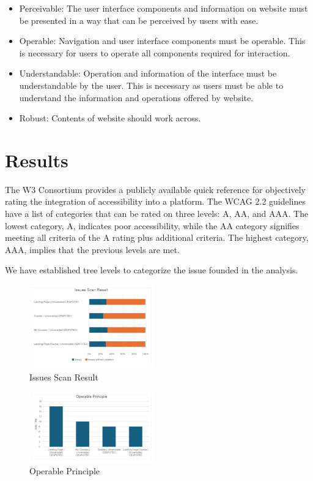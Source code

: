 \documentclass{IEEEtran}
\begin{document}
\begin{itemize}
    \item Perceivable: The user interface components and information on website must be presented in a way that can be perceived by users with ease.
    \item Operable: Navigation and user interface components must be operable. This is necessary for users to operate all components required for interaction.
    \item Understandable: Operation and information of the interface must be understandable by the user. This is necessary as users must be able to understand the information and operations offered by website.
    \item Robust: Contents of website should work across.
\end{itemize}



\section{Results}
The W3 Consortium provides a publicly available quick reference for objectively rating the integration of accessibility into a platform. The WCAG 2.2 guidelines have a list of categories that can be rated on three levels: A, AA, and AAA. The lowest category, A, indicates poor accessibility, while the AA category signifies meeting all criteria of the A rating plus additional criteria. The highest category, AAA, implies that the previous levels are met.

We have established tree levels to categorize the issue founded in the analysis.

\begin{figure}[H]
    \includegraphics[width=0.48\textwidth]{images/scanResult.png}
    \caption{Issues Scan Result}
    \label{fig:scanResult}
\end{figure}

\begin{figure}[H]
    \includegraphics[width=0.48\textwidth]{images/operablePrinciple.png}
    \caption{Operable Principle}
    \label{fig:operablePrinciple}
\end{figure}
\end{document}
